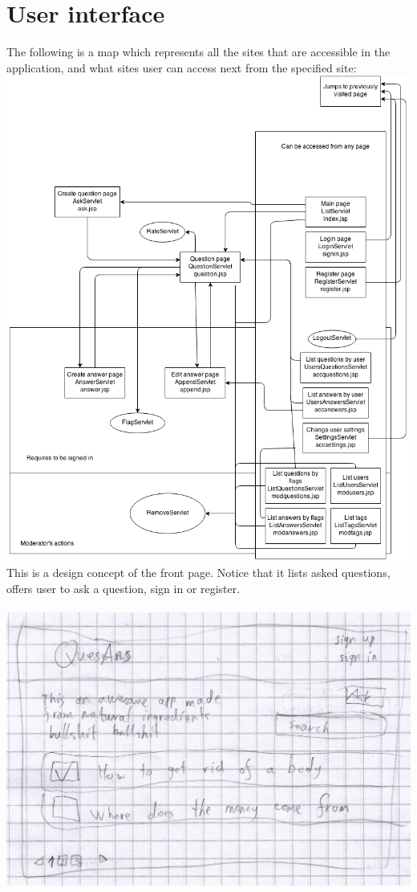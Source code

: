 \documentclass[a4paper,12pt]{article}
\begin{document}
\section{User interface}

The following is a map which represents all the sites that are accessible in the application, and what sites user can access next from the specified site:\\
\includegraphics[scale=0.55]{sitemap2}\\
This is a design concept of the front page. Notice that it lists asked questions, offers user to ask a question, sign in or register.\\
\\
\includegraphics[scale=0.9]{FrontPage}
\newpage
\end{document}
